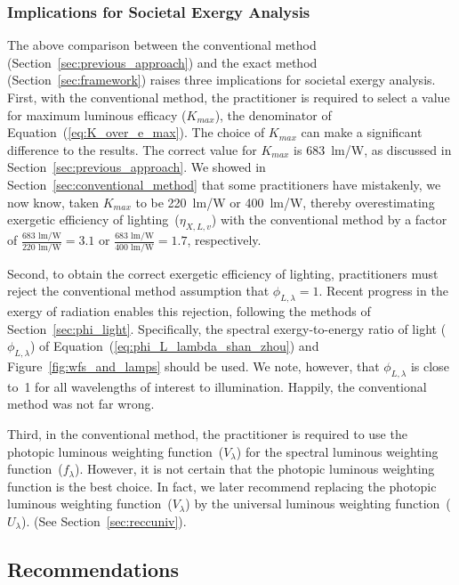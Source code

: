 \documentclass[energies,article,accept,moreauthors,pdftex]{Definitions/mdpi}\usepackage[]{graphicx}\usepackage[]{color}
\begin{document}
\subsubsection{Implications for Societal Exergy Analysis} 
\label{sec:implications_for_sea}



The above comparison between the conventional method (Section~\ref{sec:previous_approach}) and
the exact method (Section~\ref{sec:framework})
raises three implications for societal exergy analysis.
First, with the conventional method, 
the practitioner is required to select a value for maximum luminous efficacy ($K_{max}$), 
the denominator of Equation~(\ref{eq:K_over_e_max}).
The choice of $K_{max}$ can make a significant difference to the results.
The correct value for $K_{max}$ is 683~lm/W,
as discussed in Section~\ref{sec:previous_approach}.
We showed in Section~\ref{sec:conventional_method} that
some practitioners have mistakenly, we now know, taken $K_{max}$ to be 
220~lm/W or 400~lm/W,
thereby overestimating exergetic efficiency of lighting~($\eta_{X,L,v}$)
with the conventional method
by a factor of
$\frac{683 \text{ lm/W}}{220 \text{ lm/W}} 
  = 3.1$
or
$\frac{683 \text{ lm/W}}{400 \text{ lm/W}} 
  = 1.7$,
respectively.

Second, to obtain the correct exergetic efficiency of lighting, 
practitioners must reject the conventional method assumption that $\phi_{L,\lambda} = 1$.
Recent progress in the exergy of radiation enables this rejection, 
following the methods of Section~\ref{sec:phi_light}.
Specifically, the spectral exergy-to-energy ratio of light ($\phi_{L,\lambda}$)
of Equation~(\ref{eq:phi_L_lambda_shan_zhou}) and Figure~\ref{fig:wfs_and_lamps} should be used.
We note, however, that $\phi_{L,\lambda}$ is close to~1 for all wavelengths of interest to illumination.
Happily, the conventional method was not far wrong.

Third, in the conventional method, 
the practitioner is required to use the photopic luminous weighting function~($V_\lambda$)
for the spectral luminous weighting function~($f_\lambda$).
However, it is not certain that the photopic luminous weighting function
is the best choice.
In fact, we later recommend replacing the photopic luminous weighting function~($V_\lambda$)
by the universal luminous weighting function~($U_\lambda$).
(See Section~\ref{sec:reccuniv}).


\subsection{Recommendations}
\label{sec:recommendations}
\end{document}
